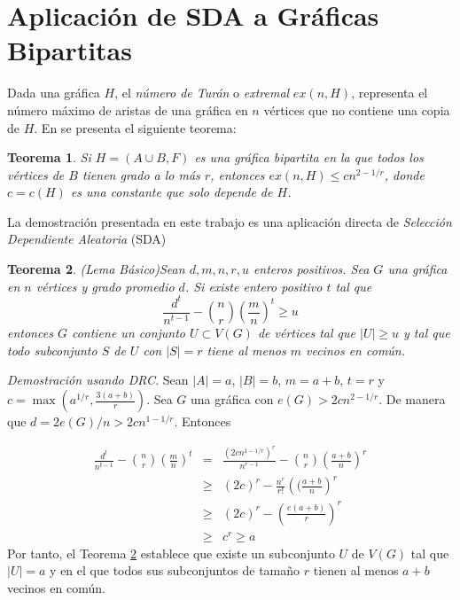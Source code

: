 \documentclass[14pt]{article}
\newtheorem{theorem}{Teorema}
\begin{document}
\section*{Aplicación de SDA a Gráficas Bipartitas}

Dada una gráfica $H$, el \textit{número de Turán} o \textit{extremal}
$ex(n, H)$, representa el número máximo de aristas de una gráfica en
$n$ vértices que no contiene una copia de $H$. En \cite{fox2010drc}
se presenta el siguiente teorema:

\begin{theorem}
  Si $H = (A \cup B, F)$ es una gráfica bipartita en la que todos los
  vértices de $B$ tienen grado
  a lo más $r$, entonces $ex(n, H) \leq c n^{2 - 1 / r}$, donde $c =
  c(H)$ es una constante que solo depende de $H$.
\end{theorem}

La demostración presentada en este trabajo es una aplicación directa
de \textit{Selección Dependiente Aleatoria} (SDA)
\begin{theorem}(Lema Básico)\label{drc}
  Sean $d, m, n, r, u$ enteros positivos. Sea $G$ una gráfica en
  $n$ vértices y grado promedio $d$. Si existe
  entero positivo $t$
  tal que
  $$\frac{d^t}{n^{t-1}} - \binom{n}{r} \left(\frac{m}{n}\right)^t \geq u$$
  entonces $G$ contiene un conjunto $U \subset V(G)$ de vértices tal que
  $\vert U \vert \geq u$ y tal que todo subconjunto $S$ de $U$ con
  $\vert S \vert = r$
  tiene al menos $m$ vecinos en común.
\end{theorem}
\textit{Demostración usando DRC}. Sean $\vert A \vert = a$, $\vert B
\vert = b$, $m = a + b$, $t = r$
y $c = \max(a^{1/r}, \frac{3(a + b)}{r})$. Sea $G$ una gráfica con
$e(G) > 2 c n^{2 -1 /
r}$. De manera que $d = 2e(G) / n > 2 c n^{1 - 1/r}$. Entonces

\begin{eqnarray*}
  \frac{d^{t}}{n^{t-1}} - \binom{n}{r} \left(\frac{m}{n}\right)^t &=& \frac{(2c
  n^{1-1/r})^r}{n^{r-1}}  - \binom{n}{r} \left(\frac{a + b}{n}\right)^r\\
  &\geq& (2c)^r - \frac{n^r}{r!} \left((\frac{a + b}{n}\right)^r \\
    &\geq& (2c)^r - \left(\frac{e (a + b)}{r}\right)^r\\
    &\geq& c^r \geq a
  \end{eqnarray*}
  Por tanto, el Teorema \ref{drc} establece que existe un subconjunto
  $U$ de $V(G)$ tal que $\vert U \vert = a$ y en el que todos sus
  subconjuntos de tamaño
  $r$ tienen al menos $a + b$ vecinos en común.
\end{document}
